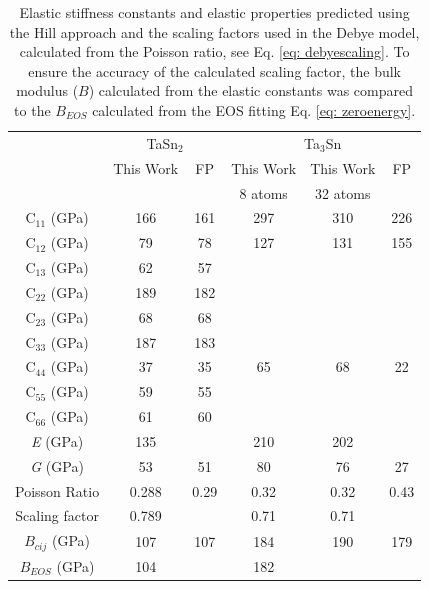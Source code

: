 \newpage
\begin{table}[H]
	\caption{Elastic stiffness constants and elastic properties predicted using the Hill approach and the scaling factors used in the Debye model, calculated from the Poisson ratio, see Eq. \ref{eq: debyescaling}. To ensure the accuracy of the calculated scaling factor, the bulk modulus ($B$) calculated from the elastic constants was compared to the $B_{EOS}$ calculated from the EOS fitting Eq. \ref{eq: zeroenergy}.}
	\centering
	\begin{tabular}{ c c c c c c }
		\hline
		  & \multicolumn{2}{c}{TaSn$_2$} & \multicolumn{3}{c}{Ta$_3$Sn}\\
		  & This Work & FP & This Work & This Work  & FP\\
		  & & \cite{Jouault1967_611,Bergerhoff1983,Karlsruhe,MaterialsProject} & 8 atoms & 32 atoms & \cite{Bergerhoff1983,Geller1955_165,Karlsruhe,MaterialsProject}\\
		  \hline
		  C$_{11}$ (GPa) & 166 & 161 & 297 & 310 & 226\\
		  C$_{12}$ (GPa) & 79 & 78 & 127 & 131 & 155\\
		  C$_{13}$ (GPa) & 62 & 57 & & & \\
		  C$_{22}$ (GPa) & 189 & 182 & & & \\
		  C$_{23}$ (GPa) & 68 & 68 & & & \\
		  C$_{33}$ (GPa) & 187 & 183 & & & \\
		  C$_{44}$ (GPa) & 37 & 35 & 65 & 68 & 22\\
		  C$_{55}$ (GPa) & 59 & 55 & & & \\
		  C$_{66}$ (GPa) & 61 & 60 & & & \\
		  \textit{E} (GPa) & 135 & & 210 & 202 &  \\
		  \textit{G} (GPa) & 53 & 51 & 80 & 76 & 27\\
		  Poisson Ratio & 0.288 & 0.29 & 0.32 & 0.32 & 0.43\\
		  Scaling factor & 0.789 & & 0.71 & 0.71 & \\
		  $B_{cij}$ (GPa) & 107 & 107 & 184 & 190 & 179\\
		  $B_{EOS}$ (GPa) & 104 & & 182 & & \\
		\hline
	\end{tabular}
	\label{Ch4-table:TaSnelastic}
\end{table}
\clearpage

